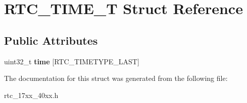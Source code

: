 \hypertarget{struct_r_t_c___t_i_m_e___t}{\section{R\+T\+C\+\_\+\+T\+I\+M\+E\+\_\+\+T Struct Reference}
\label{struct_r_t_c___t_i_m_e___t}
}
\subsection*{Public Attributes}
\begin{DoxyCompactItemize}
\item 
\hypertarget{struct_r_t_c___t_i_m_e___t_ac45cc767fc67da10dedd9834caf783e6}{uint32\+\_\+t {\bfseries time} \mbox{[}R\+T\+C\+\_\+\+T\+I\+M\+E\+T\+Y\+P\+E\+\_\+\+L\+A\+S\+T\mbox{]}}\label{struct_r_t_c___t_i_m_e___t_ac45cc767fc67da10dedd9834caf783e6}

\end{DoxyCompactItemize}


The documentation for this struct was generated from the following file\+:\begin{DoxyCompactItemize}
\item 
rtc\+\_\+17xx\+\_\+40xx.\+h\end{DoxyCompactItemize}
